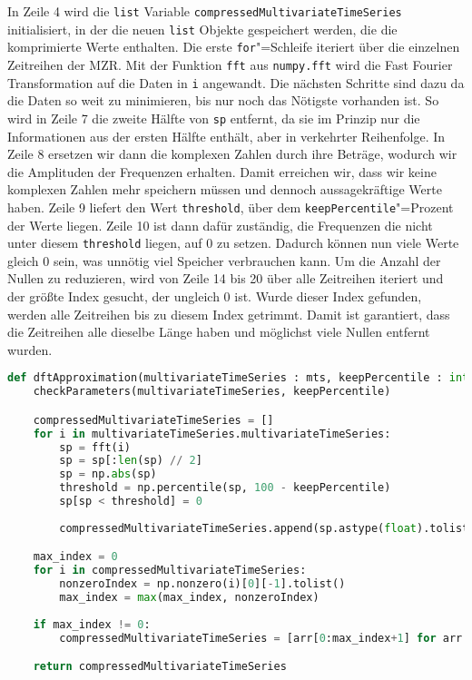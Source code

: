 In Zeile 4 wird die \lstinline|list| Variable \lstinline|compressedMultivariateTimeSeries| initialisiert, in der die neuen \lstinline|list| Objekte gespeichert werden, die die komprimierte Werte enthalten. Die erste \lstinline|for|"=Schleife iteriert über die einzelnen Zeitreihen der \ac{MZR}. Mit der Funktion \lstinline|fft| aus \lstinline|numpy.fft| wird die Fast Fourier Transformation auf die Daten in \lstinline|i| angewandt. Die nächsten Schritte sind dazu da die Daten so weit zu minimieren, bis nur noch das Nötigste vorhanden ist. So wird in Zeile 7 die zweite Hälfte von \lstinline|sp| entfernt, da sie im Prinzip nur die Informationen aus der ersten Hälfte enthält, aber in verkehrter Reihenfolge. In Zeile 8 ersetzen wir dann die komplexen Zahlen durch ihre Beträge, wodurch wir die Amplituden der Frequenzen erhalten. Damit erreichen wir, dass wir keine komplexen Zahlen mehr speichern müssen und dennoch aussagekräftige Werte haben. Zeile 9 liefert den Wert \lstinline|threshold|, über dem \lstinline|keepPercentile|"=Prozent der Werte liegen. Zeile 10 ist dann dafür zuständig, die Frequenzen die nicht unter diesem \lstinline|threshold| liegen, auf 0 zu setzen. Dadurch können nun viele Werte gleich 0 sein, was unnötig viel Speicher verbrauchen kann. Um die Anzahl der Nullen zu reduzieren, wird von Zeile 14 bis 20 über alle Zeitreihen iteriert und der größte Index gesucht, der ungleich 0 ist. Wurde dieser Index gefunden, werden alle Zeitreihen bis zu diesem Index getrimmt. Damit ist garantiert, dass die Zeitreihen alle dieselbe Länge haben und möglichst viele Nullen entfernt wurden.
\begin{lstlisting}[caption={Diskrete Fourier"=Transformation}, label=lst:diskretefouriertransformation, style=Python, language=Python]
def dftApproximation(multivariateTimeSeries : mts, keepPercentile : int):
    checkParameters(multivariateTimeSeries, keepPercentile)

    compressedMultivariateTimeSeries = []
    for i in multivariateTimeSeries.multivariateTimeSeries:
        sp = fft(i)
        sp = sp[:len(sp) // 2]
        sp = np.abs(sp)
        threshold = np.percentile(sp, 100 - keepPercentile)
        sp[sp < threshold] = 0
        
        compressedMultivariateTimeSeries.append(sp.astype(float).tolist())

    max_index = 0
    for i in compressedMultivariateTimeSeries:
        nonzeroIndex = np.nonzero(i)[0][-1].tolist()
        max_index = max(max_index, nonzeroIndex)
        
    if max_index != 0:
        compressedMultivariateTimeSeries = [arr[0:max_index+1] for arr in compressedMultivariateTimeSeries]

    return compressedMultivariateTimeSeries
\end{lstlisting}